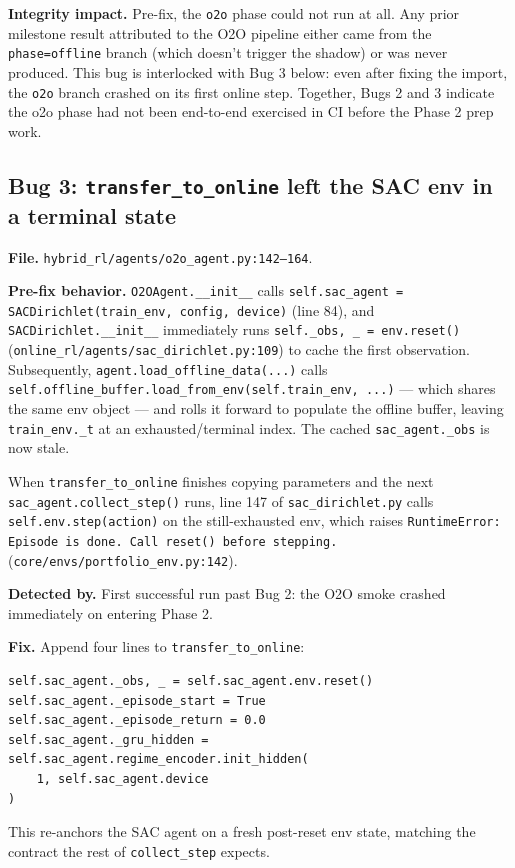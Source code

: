 \textbf{Integrity impact.} Pre-fix, the \texttt{o2o} phase could not
run at all. Any prior milestone result attributed to the O2O pipeline
either came from the \texttt{phase=offline} branch (which doesn't
trigger the shadow) or was never produced. This bug is interlocked with
Bug 3 below: even after fixing the import, the \texttt{o2o} branch
crashed on its first online step. Together, Bugs 2 and 3 indicate the
o2o phase had not been end-to-end exercised in CI before the Phase 2
prep work.

\subsection{Bug 3: \texttt{transfer\_to\_online} left the SAC env in a
terminal state}
\label{app:impl:terminal-env}

\textbf{File.} \texttt{hybrid\_rl/agents/o2o\_agent.py:142--164}.

\textbf{Pre-fix behavior.} \texttt{O2OAgent.\_\_init\_\_} calls
\texttt{self.sac\_agent = SACDirichlet(train\_env, config, device)}
(line 84), and \texttt{SACDirichlet.\_\_init\_\_} immediately runs
\texttt{self.\_obs, \_ = env.reset()}
(\texttt{online\_rl/agents/sac\_dirichlet.py:109}) to cache the first
observation. Subsequently, \texttt{agent.load\_offline\_data(...)}
calls \texttt{self.offline\_buffer.load\_from\_env(self.train\_env, ...)}
--- which shares the same env object --- and rolls it forward to
populate the offline buffer, leaving \texttt{train\_env.\_t} at an
exhausted/terminal index. The cached \texttt{sac\_agent.\_obs} is now
stale.

When \texttt{transfer\_to\_online} finishes copying parameters and the
next \texttt{sac\_agent.collect\_step()} runs, line 147 of
\texttt{sac\_dirichlet.py} calls \texttt{self.env.step(action)} on the
still-exhausted env, which raises \texttt{RuntimeError: Episode is
done. Call reset() before stepping.}
(\texttt{core/envs/portfolio\_env.py:142}).

\textbf{Detected by.} First successful run past Bug 2: the O2O smoke
crashed immediately on entering Phase 2.

\textbf{Fix.} Append four lines to \texttt{transfer\_to\_online}:
\begin{verbatim}
self.sac_agent._obs, _ = self.sac_agent.env.reset()
self.sac_agent._episode_start = True
self.sac_agent._episode_return = 0.0
self.sac_agent._gru_hidden = self.sac_agent.regime_encoder.init_hidden(
    1, self.sac_agent.device
)
\end{verbatim}
This re-anchors the SAC agent on a fresh post-reset env state, matching
the contract the rest of \texttt{collect\_step} expects.


